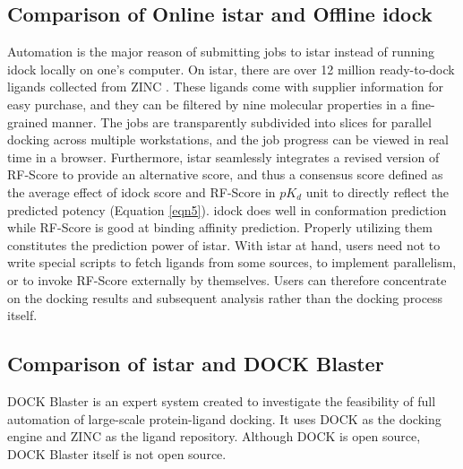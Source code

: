 \documentclass[10pt]{article}
\begin{document}
\subsection*{Comparison of Online istar and Offline idock}
Automation is the major reason of submitting jobs to istar instead of running idock locally on one's computer. On istar, there are over 12 million ready-to-dock ligands collected from ZINC \cite{532,1178}. These ligands come with supplier information for easy purchase, and they can be filtered by nine molecular properties in a fine-grained manner. The jobs are transparently subdivided into slices for parallel docking across multiple workstations, and the job progress can be viewed in real time in a browser. Furthermore, istar seamlessly integrates a revised version of RF-Score to provide an alternative score, and thus a consensus score defined as the average effect of idock score and RF-Score in $pK_d$ unit to directly reflect the predicted potency (Equation \eqref{eqn5}). idock does well in conformation prediction while RF-Score is good at binding affinity prediction. Properly utilizing them constitutes the prediction power of istar. With istar at hand, users need not to write special scripts to fetch ligands from some sources, to implement parallelism, or to invoke RF-Score externally by themselves. Users can therefore concentrate on the docking results and subsequent analysis rather than the docking process itself.

\subsection*{Comparison of istar and DOCK Blaster}
DOCK Blaster \cite{557} is an expert system created to investigate the feasibility of full automation of large-scale protein-ligand docking. It uses DOCK \cite{1222} as the docking engine and ZINC \cite{532,1178} as the ligand repository. Although DOCK is open source, DOCK Blaster itself is not open source.
\end{document}
